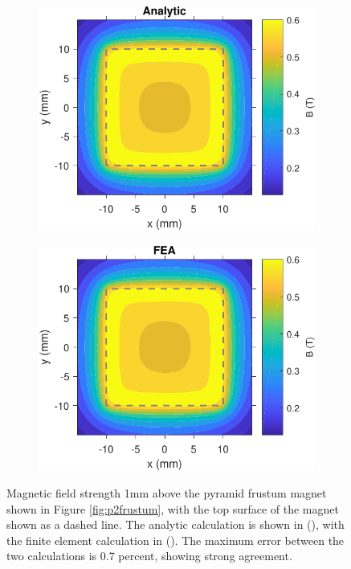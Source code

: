 \begin{figure}
	\centering
	\begin{subfigure}{0.65\textwidth}
		\centering
		\includegraphics[width=\textwidth]{p2/p2FIG5a}
		\caption{}\label{fig:frustumfielda}\vspace{5mm}
	\end{subfigure}
	
	\begin{subfigure}{0.65\textwidth}
		\centering
		\includegraphics[width=\textwidth]{p2/p2FIG5b}
		\caption{}\label{fig:frustumfieldb}
	\end{subfigure}
	\caption{Magnetic field strength 1mm above the pyramid frustum magnet shown in Figure \ref{fig:p2frustum}, with the top surface of the magnet shown as a dashed line. The analytic calculation is shown in (), with the finite element calculation in (). The maximum error between the two calculations is 0.7 percent, showing strong agreement.}
	\label{fig:p2frustumfield}
\end{figure}

